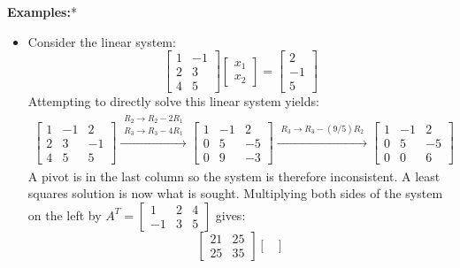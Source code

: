 \documentclass{article}
\begin{document}
\textbf{Examples:}*
\begin{itemize}
\item Consider the linear system:
\[\begin{bmatrix}
1 & -1 \\ 
2 & 3 \\ 
4 & 5
\end{bmatrix}\begin{bmatrix}
x_1 \\ x_2 
\end{bmatrix} = \begin{bmatrix}
2 \\ -1 \\ 5 
\end{bmatrix}\]
Attempting to directly solve this linear system yields:
\begin{align*}
\left[\begin{array}{cc|c}
1 & -1 &  2 \\ 
2 &  3 & -1 \\ 
4 &  5 &  5
\end{array}\right] 
\xrightarrow{\begin{array}{c} R_2 \rightarrow R_2 - 2R_1 \\ R_3 \rightarrow R_3 - 4R_1 \end{array}} 
\left[\begin{array}{cc|c}
1 & -1 &  2 \\ 
0 &  5 & -5 \\ 
0 &  9 & -3 
\end{array}\right] 
\xrightarrow{\begin{array}{c} R_3 \rightarrow R_3 - (9/5)R_2 \end{array}} 
\left[\begin{array}{cc|c}
1 & -1 &  2 \\ 
0 &  5 & -5 \\ 
0 &  0 &  6   
\end{array}\right] 
\end{align*}
A pivot is in the last column so the system is therefore inconsistent. A least squares solution is now what is sought. Multiplying both sides of the system on the left by \(A^T = \begin{bmatrix} 1 & 2 & 4 \\ -1 & 3 & 5 \end{bmatrix}\) gives:
\[\begin{bmatrix}
21 & 25 \\ 
25 & 35 
\end{bmatrix}\begin{bmatrix} 

\end{bmatrix}\]
\end{itemize}
\end{document}
